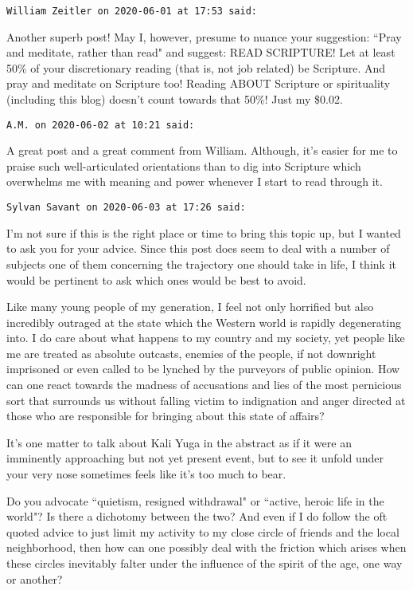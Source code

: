 \begin{footnotesize}\begin{sffamily}



\texttt{William Zeitler on 2020-06-01 at 17:53 said: }

Another superb post! May I, however, presume to nuance your suggestion: ``Pray and meditate, rather than read" and suggest: READ SCRIPTURE! Let at least 50\% of your discretionary reading (that is, not job related) be Scripture. And pray and meditate on Scripture too! Reading ABOUT Scripture or spirituality (including this blog) doesn't count towards that 50\%! Just my \$0.02.


\hfill

\texttt{A.M. on 2020-06-02 at 10:21 said: }

A great post and a great comment from William. Although, it's easier for me to praise such well-articulated orientations than to dig into Scripture which overwhelms me with meaning and power whenever I start to read through it.


\hfill

\texttt{Sylvan Savant on 2020-06-03 at 17:26 said: }

I'm not sure if this is the right place or time to bring this topic up, but I wanted to ask you for your advice. Since this post does seem to deal with a number of subjects one of them concerning the trajectory one should take in life, I think it would be pertinent to ask which ones would be best to avoid. 

Like many young people of my generation, I feel not only horrified but also incredibly outraged at the state which the Western world is rapidly degenerating into. I do care about what happens to my country and my society, yet people like me are treated as absolute outcasts, enemies of the people, if not downright imprisoned or even called to be lynched by the purveyors of public opinion. How can one react towards the madness of accusations and lies of the most pernicious sort that surrounds us without falling victim to indignation and anger directed at those who are responsible for bringing about this state of affairs?

It's one matter to talk about Kali Yuga in the abstract as if it were an imminently approaching but not yet present event, but to see it unfold under your very nose sometimes feels like it's too much to bear. 

Do you advocate ``quietism, resigned withdrawal" or ``active, heroic life in the world"? Is there a dichotomy between the two? And even if I do follow the oft quoted advice to just limit my activity to my close circle of friends and the local neighborhood, then how can one possibly deal with the friction which arises when these circles inevitably falter under the influence of the spirit of the age, one way or another?



\end{sffamily}
\end{footnotesize}
